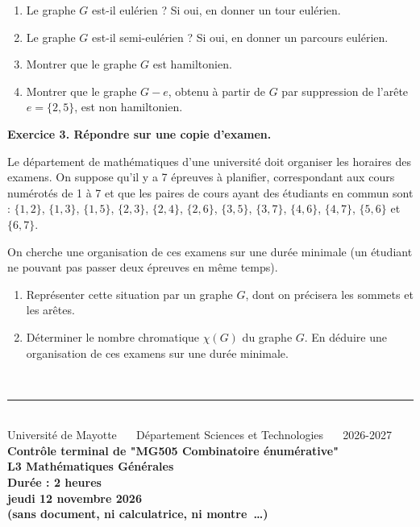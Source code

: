 \documentclass[10pt]{article}
\begin{document}
 \begin{enumerate}
 \item Le graphe $G$ est-il eulérien ? Si oui, en donner un tour eulérien.
 \item Le graphe $G$ est-il semi-eulérien ? Si oui, en donner un parcours eulérien.
\item Montrer que le graphe $G$ est hamiltonien.
\item Montrer que le graphe $G - e$, obtenu à partir de $G$ par suppression de l'arête $e = \{2,5\}$, est non hamiltonien.

\end{enumerate}

\noindent \textbf{Exercice 3. Répondre sur une copie d'examen.}

Le département de mathématiques d'une universit\'e doit organiser les
horaires des examens. On
suppose qu'il y a 7 \'epreuves \`a planifier, correspondant aux
cours num\'erot\'es de 1 \`a 7 et que les paires de cours ayant
des \'etudiants en commun sont : $\{1, 2\}$, $\{1, 3\}$, $\{1, 5\}$, $\{2, 3\}$, $\{2, 4\}$,
$\{2, 6\}$, $\{3, 5\}$, $\{3, 7\}$, $\{4, 6\}$,
$\{4,7\}$, $\{5, 6\}$ et $\{6, 7\}$.

On cherche une organisation de ces examens sur une dur\'ee minimale
(un \'etudiant ne pouvant pas passer deux \'epreuves en m\^eme
temps).
\begin{enumerate}
\item Représenter cette situation par un graphe $G$, dont on précisera les sommets et les arêtes.
\item Déterminer le nombre chromatique $\chi(G)$ du graphe $G$. En déduire une organisation de ces examens sur une durée minimale.
\end{enumerate}

\newpage

\begin{center}
$\phantom{}$\vspace{-1.5cm}\\
\rule{\linewidth}{1pt}\\
Universit\'{e} de Mayotte $\phantom{aa}$ D\'{e}partement Sciences et Technologies $\phantom{aa}$ 2026-2027 \\ \vspace{0.3cm}
  \textbf{   Contr\^{o}le terminal de "MG505 Combinatoire énumérative"  \\ L3 Math\'ematiques Générales  \\ Dur\'{e}e : 2 heures \\
   jeudi 12 novembre 2026 \\
(sans document, ni calculatrice, ni montre~\dots)}
\end{center}
\end{document}
